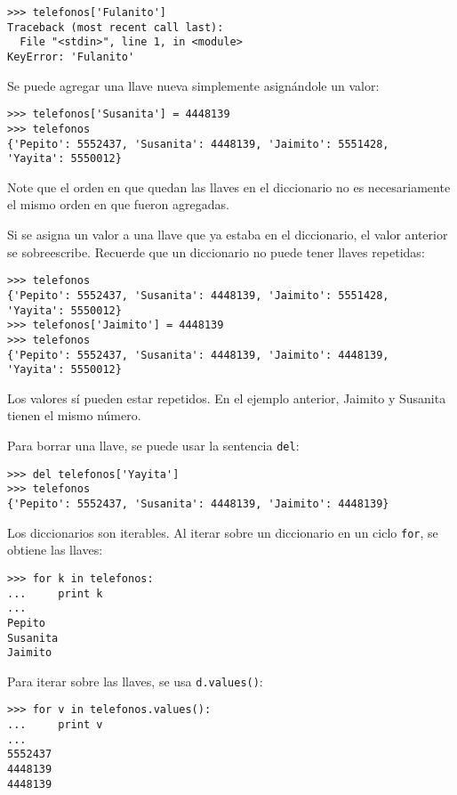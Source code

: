 \begin{lstlisting}
>>> telefonos['Fulanito']
Traceback (most recent call last):
  File "<stdin>", line 1, in <module>
KeyError: 'Fulanito'
\end{lstlisting}

Se puede agregar una llave nueva simplemente asignándole un valor:

\begin{lstlisting}
>>> telefonos['Susanita'] = 4448139
>>> telefonos
{'Pepito': 5552437, 'Susanita': 4448139, 'Jaimito': 5551428,
'Yayita': 5550012}
\end{lstlisting}

Note que el orden en que quedan las llaves en el diccionario no es
necesa\-ria\-mente el mismo orden en que fueron agregadas.

Si se asigna un valor a una llave que ya estaba en el diccionario, el
valor anterior se sobreescribe. Recuerde que un diccionario no puede
tener llaves repetidas:

\begin{lstlisting}
>>> telefonos
{'Pepito': 5552437, 'Susanita': 4448139, 'Jaimito': 5551428,
'Yayita': 5550012}
>>> telefonos['Jaimito'] = 4448139
>>> telefonos
{'Pepito': 5552437, 'Susanita': 4448139, 'Jaimito': 4448139,
'Yayita': 5550012}
\end{lstlisting}

Los valores sí pueden estar repetidos. En el ejemplo anterior, Jaimito y
Susanita tienen el mismo número.

Para borrar una llave, se puede usar la sentencia \lstinline!del!:

\begin{lstlisting}
>>> del telefonos['Yayita']
>>> telefonos
{'Pepito': 5552437, 'Susanita': 4448139, 'Jaimito': 4448139}
\end{lstlisting}

Los diccionarios son iterables. Al iterar sobre un diccionario en un
ciclo \lstinline!for!, se obtiene las llaves:

\begin{lstlisting}
>>> for k in telefonos:
...     print k
...
Pepito
Susanita
Jaimito
\end{lstlisting}

Para iterar sobre las llaves, se usa \lstinline!d.values()!:

\begin{lstlisting}
>>> for v in telefonos.values():
...     print v
...
5552437
4448139
4448139
\end{lstlisting}

